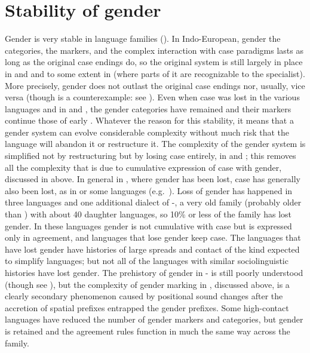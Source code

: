 \documentclass[output=collectionpaper]{langsci/langscibook}
\begin{document}
\section{Stability of gender}
Gender is very stable in language families (\citealt{Matasovic2007,Matasovic2014}). In Indo-\linebreak[4]{}European, gender \textendash{} the categories, the markers, and the complex interaction with case para\-digms \textendash{} lasts as long as the original case endings do, so the original system is still largely in place in  and  and to some extent in  (where parts of it are recognizable to the specialist). More precisely, gender does not outlast the original case endings \textendash{} nor, usually, vice versa (though  is a counterexample: see \citealt{Kulikov2006}). Even when case was lost in the various  languages and in  and , the gender categories have remained and their markers continue those of early . Whatever the reason for this stability, it means that a gender system can evolve considerable complexity without much risk that the language will abandon it or restructure it. The complexity of the  gender system is simplified not by restructuring but by losing case entirely, in  and ; this removes all the complexity that is due to cumulative expression of case with gender, discussed in  above. In general in , where gender has been lost, case has generally also been lost, as in  or some  languages (e.g.\ ). Loss of gender has happened in three languages and one additional dialect of -, a very old family (probably older than ) with about 40 daughter languages, so 10\% or less of the family has lost gender. In these languages gender is not cumulative with case but is expressed only in agreement, and languages that lose gender keep case. The languages that have lost gender have histories of large spreads and contact of the kind expected to simplify languages; but not all of the languages with similar sociolinguistic histories have lost gender. The prehistory of gender in - is still poorly understood (though see \citealt{Schulze1998}), but the complexity of gender marking in , discussed above, is a clearly secondary phenomenon caused by positional sound changes after the accretion of spatial prefixes entrapped the gender prefixes. Some high-contact languages have reduced the number of gender markers and categories, but gender is retained and the agreement rules function in much the same way across the family.
\end{document}
